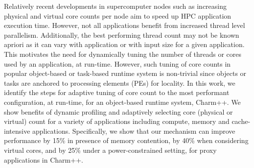 Relatively recent developments in supercomputer nodes such as increasing physical and virtual core counts per node aim to speed up HPC application execution time. However, not all applications benefit from increased thread level parallelism. Additionally, the best performing thread count may not be known apriori as it can vary with application or with input size for a given application. This motivates the need for dynamically tuning the number of threads or cores used by an application, at run-time. However, such tuning of core counts in popular object-based or task-based runtime system is non-trivial since objects or tasks are anchored to processing elements (PEs) for locality. In this work, we identify the steps for adaptive tuning of core count to the most performant configuration, at run-time, for an object-based runtime system, Charm++. We show benefits of dynamic profiling and adaptively selecting core (physical or virtual) count for a variety of applications including compute, memory and cache-intensive applications. Specifically, we show that our mechanism can improve performance by 15\% in presence of memory contention, by 40\% when considering virtual cores, and by 25\% under a power-constrained setting, for proxy applications in Charm++.

